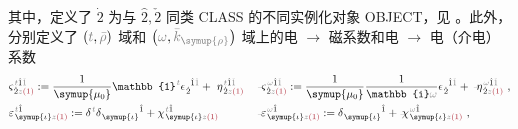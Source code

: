 其中，定义了 $\dot{2}$ 为与 $\hat{2},\check{2}$ 同类 CLASS 的不同实例化对象 OBJECT，见 。此外，分别定义了 $\left( \mathcolor{gray}{t}, \mathcolor{gray}{\bar{\rho}} \right)$ 域和 $\left( \mathcolor{gray}{\omega}, \mathcolor{gray}{\bar{k}_{\symup{\rho}}} \right)$ 域上的电 $\to$ 磁系数和电 $\to$ 电（介电）系数
\begin{subequations}
\begin{align}
	&\varsigma^{\;\! \mathcolor{gray}{t} \hat{1} \mathcolor{gray}{\check{1}}}_{\;\! \dot{2} \mathcolor{gray}{z} \textcolor{Maroon}{(1)}} := \frac{1}{\symup{\mu_0}} \mathbb{1}^{\;\! \mathcolor{gray}{t}} \epsilon^{\;\! \hphantom{\dot{2}} \hat{1} \mathcolor{gray}{\check{1}}}_{\;\! \dot{2}} + ~\eta^{\;\! \mathcolor{gray}{t} \hat{1} \mathcolor{gray}{\check{1}}}_{\;\! \dot{2} \mathcolor{gray}{z} \textcolor{Maroon}{(1)}}
	&&\Xint{\begin{smallmatrix} ~ \\ {}^{}_{\mathcolor{gray}{-}} \\ ~ \end{smallmatrix}}{13}{\varsigma}^{\;\! \mathcolor{gray}{\omega} \hat{1} \mathcolor{gray}{\check{1}}}_{\;\! \dot{2} \mathcolor{gray}{z} \textcolor{Maroon}{(1)}} := \frac{1}{\symup{\mu_0}} \frac{1}{\mathbb{i} \mathcolor{gray}{\omega}} \epsilon^{\;\! \hphantom{\dot{2}} \hat{1} \mathcolor{gray}{\check{1}}}_{\;\! \dot{2}} + \Xint{\begin{smallmatrix} ~ \\ {}^{}_{\mathcolor{gray}{-}} \\ ~ \end{smallmatrix}}{17}{\eta}^{\;\! \mathcolor{gray}{\omega} \hat{1} \mathcolor{gray}{\check{1}}}_{\;\! \dot{2} \mathcolor{gray}{z} \textcolor{Maroon}{(1)}}~, \label{eq:varsigma_rho} \\
	&\varepsilon^{\;\! \mathcolor{gray}{t} \hat{1}}_{\;\! \symup{\iota} \mathcolor{gray}{z} \textcolor{Maroon}{(1)}} := \delta^{\;\! \mathcolor{gray}{t}} \delta^{\;\! \hphantom{\symup{\iota}} \hat{1}}_{\;\! \symup{\iota} \hphantom{z}} + \chi^{\;\! \mathcolor{gray}{t} \hat{1}}_{\;\! \symup{\iota} \mathcolor{gray}{z} \textcolor{Maroon}{(1)}}
	&&\Xint{\begin{smallmatrix} ~ \\ {}^{}_{\mathcolor{gray}{-}} \\ ~ \end{smallmatrix}}{16}{\varepsilon}^{\;\! \mathcolor{gray}{\omega} \hat{1}}_{\;\! \symup{\iota} \mathcolor{gray}{z} \textcolor{Maroon}{(1)}} := \delta^{\;\! \hphantom{\symup{\iota}} \hat{1}}_{\;\! \symup{\iota} \hphantom{z}} + \Xint{{}^{}_{\mathcolor{gray}{-}}}{23}{\chi}^{\;\! \mathcolor{gray}{\omega} \hat{1}}_{\;\! \symup{\iota} \mathcolor{gray}{z} \textcolor{Maroon}{(1)}}~, \label{eq:varepsilon_rho}
\end{align}
\end{subequations}
